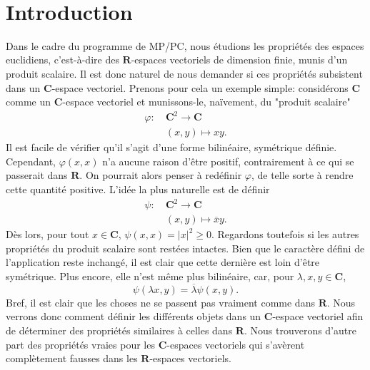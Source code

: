 \documentclass[a4paper,11pt]{article}
\newcommand{\R}{\mathbf{R}}
\newcommand{\C}{\mathbf{C}}
\newcommand{\titre}[1]{
		\colorbox{vert1}{
		\parbox{\headwidth}{
			\center{\Large{\sffamily\bfseries{\color{gris}{#1}}}}\\
			\vspace*{1em}
		}}
	}
\begin{document}
\thispagestyle{empty}				%
\pagecolor{gris}						%
\titre{Espaces hermitiens}			%
\vspace*{1em}

\section*{Introduction}
Dans le cadre du programme de MP/PC, nous étudions les propriétés des espaces euclidiens, c'est-à-dire des $\R$-espaces vectoriels de dimension finie, munis d'un produit scalaire. Il est donc naturel de nous demander si ces propriétés subsistent dans un $\C$-espace vectoriel. Prenons pour cela un exemple simple: considérons $\C$ comme un $\C$-espace vectoriel et munissons-le, naïvement, du "produit scalaire"
\begin{align*}
\varphi:\ &\C^2\rightarrow\C\\
&(x,y)\mapsto xy.
\end{align*}
Il est facile de vérifier qu'il s'agit d'une forme bilinéaire, symétrique définie. Cependant, $\varphi(x,x)$ n'a aucune raison d'être positif, contrairement à ce qui se passerait dans $\R$. On pourrait alors penser à redéfinir $\varphi$, de telle sorte à rendre cette quantité positive. L'idée la plus naturelle est de définir
\begin{align*}
\psi:\ &\C^2\rightarrow\C\\
&(x,y)\mapsto \overline{x}y.
\end{align*} 
Dès lors, pour tout $x\in\C$, $\psi(x,x)=\vert x\vert^2\geq 0$. Regardons toutefois si les autres propriétés du produit scalaire sont restées intactes. Bien que le caractère défini de l'application reste inchangé, il est clair que cette dernière est loin d'être symétrique. Plus encore, elle n'est même plus bilinéaire, car, pour $\lambda,x,y\in\C$, \[\psi(\lambda x,y)=\overline{\lambda}\psi(x,y).\]
Bref, il est clair que les choses ne se passent pas vraiment comme dans $\R$. Nous verrons donc comment définir les différents objets dans un $\C$-espace vectoriel afin de déterminer des propriétés similaires à celles dans $\R$. Nous trouverons d'autre part des propriétés vraies pour les $\C$-espaces vectoriels qui s'avèrent complètement fausses dans les $\R$-espaces vectoriels.
\end{document}
